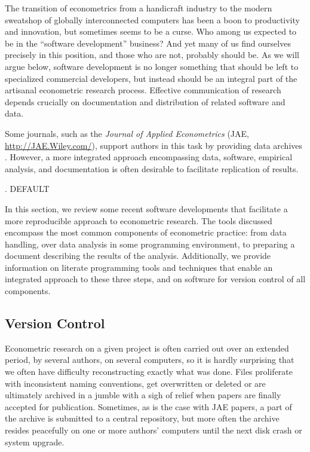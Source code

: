 \documentclass[10pt,a4paper,twoside]{article}
\renewcommand{\section}{\secdef \mysec \mysecnn}
\newcommand{\mysec}[2][default]{\vspace{1.7\baselineskip}%
  \pdfbookmark[1]{#1}{Section.#1}%
  \refstepcounter{section}%
  \centerline{\large \thesection. \uppercase{#1}} \vspace{.5\baselineskip}}
\newcommand{\mysecnn}[1]{\vspace{1.7\baselineskip}%
  \centerline{\large #1} \vspace{.5\baselineskip}}
\begin{document}
The transition of econometrics from a handicraft industry
\citep{repro:Wilson:1973,repro:Goldberger:2004}
to the modern sweatshop of globally interconnected computers
has been a boon to productivity and innovation, but sometimes
seems to be a curse.  Who among us expected to be in the ``software
development'' business?  And yet many of us find ourselves  precisely
in this position, and those who are not, probably should be.  As
we will argue below, software development is no longer something  that
should be left to specialized commercial developers, but instead should
be an integral part of the artisanal econometric research process.  Effective
communication of research depends crucially on documentation and
distribution of related software and data.

Some journals, such as the \emph{Journal of Applied Econometrics}
(JAE, \url{http://JAE.Wiley.com/}), support authors in this task
by providing data archives \citep{repro:MacKinnon:2007}. However,
a more integrated approach encompassing data, software, empirical
analysis, and documentation is often desirable to facilitate
replication of results. 

\section{Software Tools} \label{sec:software}

In this section, we review some recent software developments that facilitate a more 
reproducible approach to econometric research. The tools discussed encompass
the most common components of econometric practice: from data handling, over
data analysis in some programming environment, to preparing a document describing
the results of the analysis. Additionally, we provide information on literate
programming tools and techniques that enable an integrated approach to these
three steps, and on software for version control of all components.

\subsection{Version Control} \label{sec:version}

Econometric research on a given project is often carried out over an extended
period, by several authors, on several computers, so it is hardly surprising
that we often have difficulty reconstructing exactly what was done.  Files
proliferate with inconsistent naming conventions, get overwritten or deleted
or are ultimately archived in a jumble with a sigh of relief when papers are finally
accepted for publication.  Sometimes, as is the case with JAE papers, a part of the 
archive is submitted to a central repository, but more often the archive resides
peacefully on one or more authors' computers until the next disk crash or
system upgrade.
\end{document}
